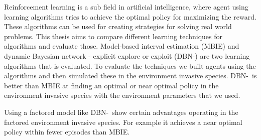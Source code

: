 
Reinforcement learning is a sub field in artificial intelligence, 
where agent using learning algorithms tries to achieve the optimal policy for maximizing the reward. 
These algorithms can be used for creating strategies for solving real world problems. 
This thesis aims to compare different learning techniques for algorithms and evaluate those. 
Model-based interval estimation (MBIE) and dynamic Bayesian network - explicit explore or exploit (DBN-\etre)
 are two learning algorithms that is evaluated. 
To evaluate the techniques we built agents using the algorithms and 
then simulated these in the environment invasive species.
DBN-\etre\ is better than MBIE at finding an optimal or near optimal policy in the 
environment invasive species with the environment parameters that we used.

Using a factored model like DBN-\etre\ show certain advantages operating in 
the factored environment invasive species. For example it achieves a near optimal
policy within fewer episodes than MBIE.





